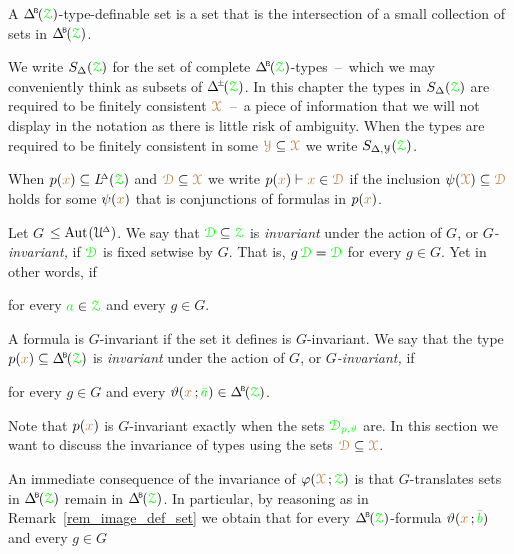 A $\BDelta(\grZ)$-type-definable set is a set that is the intersection of a small collection of sets in $\BDelta(\grZ)$.

We write \emph{$S_\Delta({\color{green}\EuScript Z})$\/} for the set of complete $\BDelta(\grZ)$-types~--~which we may conveniently think as subsets of $\pmDelta(\grZ)$.
In this chapter the types in $S_\Delta({\color{green}\EuScript Z})$ are required to be finitely consistent ${\color{brown}\EuScript X}$~--~a piece of information that we will not display in the notation as there is little risk of ambiguity.
When the types are required to be finitely consistent in some ${\color{brown}\EuScript Y}\subseteq{\color{brown}\EuScript X}$ we write \emph{$S_{\Delta,\EuScript Y}({\color{green}\EuScript Z})$.}


When $p({\color{brown} x})\subseteq L\kern-.5ex^{\scriptscriptstyle\Delta}({\color{green}\EuScript Z})$ and ${{\color{brown}\EuScript D}}\subseteq{\color{brown}\EuScript X}$ we write $p({\color{brown} x})\vdash{\color{brown}x}\in{{\color{brown}\EuScript D}}$ if the inclusion $\psi({\color{brown}\EuScript X})\subseteq{{\color{brown}\EuScript D}}$ holds for some $\psi({\color{brown} x})$ that is conjunctions of formulas in $p({\color{brown} x})$.

Let \emph{$G$\/} $\le{\rm Aut\kern.15ex}(\EuScript U\kern-.2ex^{\scriptscriptstyle\Delta})$.
We say that ${\color{green}\EuScript D}\subseteq{\color{green}\EuScript Z}$ is \emph{invariant\/} under the action of $G$, or \emph{$G$-invariant,} if  ${\color{green}\EuScript D}$ is fixed setwise by $G$.
That is, $g\,{\color{green}\EuScript D}={\color{green}\EuScript D}$ for every $g\in G$.
Yet in other words, if

\hfill for every ${\color{green} a}\in{\color{green}\EuScript Z}$ and every $g\in G$.

A formula is $G$-invariant if the set it defines is $G$-invariant.
We say that the type $p({\mr x})\subseteq\BDelta(\grZ)$ is \emph{invariant\/} under the action of $G$, or \emph{$G$-invariant,} if 

\hfill for every $g\in G$ and every $\theta({\mr x}\,;{\gr\bar a})\in\BDelta(\grZ)$.

Note that $p({\color{brown} x})$ is $G$-invariant exactly when the sets ${\color{green}\EuScript D_{p,\vartheta}}$ are.
In this section we want to discuss the invariance of types using the sets ${\color{brown}\EuScript D}\subseteq{\color{brown}\EuScript X}$.

An immediate consequence of the invariance of $\varphi({\color{brown}\EuScript X}\,;{\color{green}\EuScript Z})$ is that $G$-translates sets in $\BDelta({\grZ})$ remain in $\BDelta({\grZ})$.
In particular, by reasoning as in Remark~\ref{rem_image_def_set} we obtain that for every $\BDelta({\grZ})$-formula $\vartheta({\color{brown} x}\,;{\color{green}\bar b})$ and every $g\in G$

